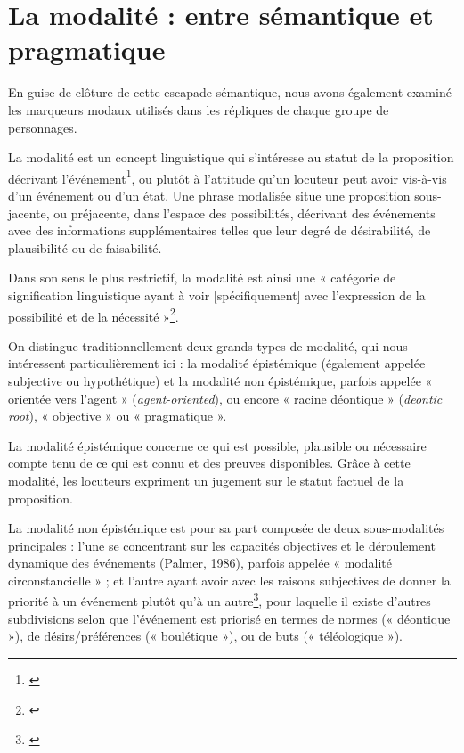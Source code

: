 \section{La modalité : entre sémantique et pragmatique}

En guise de clôture de cette escapade sémantique, nous avons également examiné les marqueurs modaux utilisés dans les répliques de chaque groupe de personnages. 

La modalité est un concept linguistique qui s'intéresse au statut de la proposition décrivant l'événement\footnote{\cite{palmer_mood_1986}}, ou plutôt à l'attitude qu'un locuteur peut avoir vis-à-vis d'un événement ou d'un état. Une phrase modalisée situe une proposition sous-jacente, ou préjacente, dans l'espace des possibilités, décrivant des événements avec des informations supplémentaires telles que leur degré de désirabilité, de plausibilité ou de faisabilité.

Dans son sens le plus restrictif, la modalité est ainsi une « catégorie de signification linguistique ayant à voir [spécifiquement] avec l'expression de la possibilité et de la nécessité »\footnote{\cite{von_fintel_modality_2006}}.

On distingue traditionnellement deux grands types de modalité, qui nous intéressent particulièrement ici : la modalité épistémique (également appelée subjective ou hypothétique) et la modalité non épistémique, parfois appelée « orientée vers l'agent » (\textit{agent-oriented}), ou encore « racine déontique »  (\textit{deontic root}), « objective »  ou « pragmatique ».

La modalité épistémique concerne ce qui est possible, plausible ou nécessaire compte tenu de ce qui est connu et des preuves disponibles. Grâce à cette modalité, les locuteurs expriment un jugement sur le statut factuel de la proposition.

La modalité non épistémique est pour sa part composée de deux sous-modalités principales : l'une se concentrant sur les capacités objectives et le déroulement dynamique des événements (Palmer, 1986), parfois appelée  « modalité circonstancielle » ; et l'autre ayant avoir avec les raisons subjectives de donner la priorité à un événement plutôt qu'à un autre\footnote{\cite{portner_modality_2010}}, pour laquelle il existe d'autres subdivisions selon que l'événement est priorisé en termes de normes (« déontique »), de désirs/préférences (« boulétique »), ou de buts (« téléologique »).

